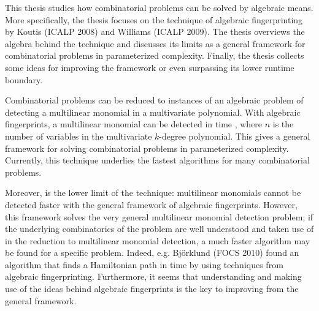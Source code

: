 %
%
\begin{enabstract}
  This thesis studies how combinatorial problems can be 
  solved %
  by algebraic means. More specifically, the thesis focuses on the technique 
  of algebraic fingerprinting by Koutis (ICALP 2008) and Williams (ICALP 2009). The thesis 
  overviews the algebra behind the technique and discusses its limits 
  as a general framework for combinatorial problems in parameterized complexity. 
  Finally, the thesis collects some ideas 
  for improving the framework or even surpassing its lower runtime boundary.

  Combinatorial problems can be reduced to instances of an algebraic problem 
  of detecting a multilinear monomial in a multivariate polynomial. 
  With algebraic fingerprints, a multilinear monomial can be detected 
  in time , where $n$ is the number of variables in the 
  multivariate $k$-degree polynomial. This gives a general framework for solving 
  combinatorial problems in parameterized complexity. 
  Currently, this technique underlies the fastest algorithms 
  for many combinatorial problems. 

  Moreover,  is the lower limit of the technique: 
  multilinear monomials cannot be detected faster 
  with the general framework of algebraic fingerprints. 
  However, this framework solves the very general multilinear monomial 
  detection problem; if the underlying combinatorics of the problem are well understood 
  and taken use of in the reduction to multilinear monomial detection, 
  a much faster algorithm may be 
  found for a specific problem. Indeed, e.g. 
  Björklund (FOCS 2010) found an algorithm that 
  finds a Hamiltonian path in time  by 
  using techniques from algebraic fingerprinting. Furthermore, 
  it seems that understanding and making use of the ideas behind algebraic fingerprints 
  is the key to improving from the general framework.
%
\end{enabstract}
